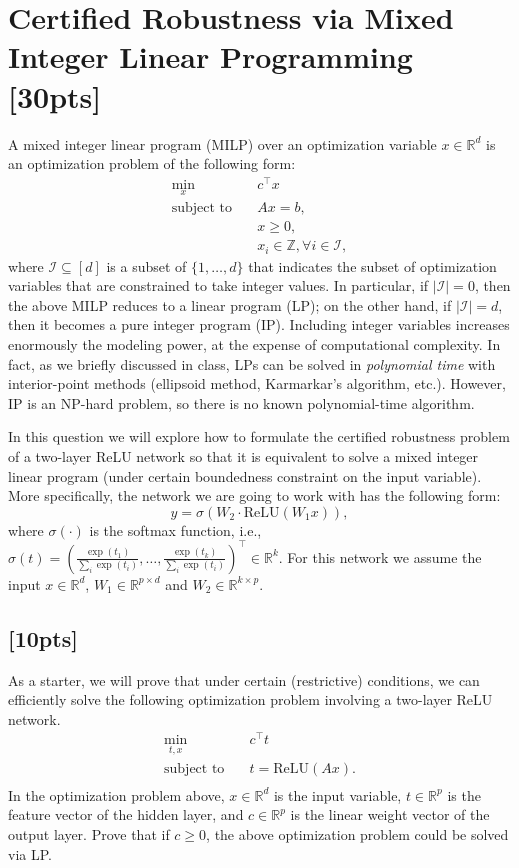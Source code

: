 \documentclass[letterpaper,11pt]{article}
\theoremstyle{definition}
\newcommand{\RR}{\mathbb{R}}
\begin{document}
\section{Certified Robustness via Mixed Integer Linear Programming [30pts]}
A mixed integer linear program (MILP) over an optimization variable $x\in\RR^d$ is an optimization problem of the following form:
\begin{align*}
    \min_x &\quad c^\top x \\
    \text{subject to} &\quad Ax = b, \\
    &\quad x \geq 0, \\
    &\quad x_i\in \mathbb{Z}, \forall i \in \mathcal{I},
\end{align*}
where $\mathcal{I}\subseteq [d]$ is a subset of $\{1, \ldots, d\}$ that indicates the subset of optimization variables that are constrained to take integer values. In particular, if $|\mathcal{I}| = 0$, then the above MILP reduces to a linear program (LP); on the other hand, if $|\mathcal{I}| = d$, then it becomes a pure integer program (IP). Including integer variables increases enormously the modeling power, at the expense of computational complexity. In fact, as we briefly discussed in class, LPs can be solved in \emph{polynomial time} with interior-point methods (ellipsoid method, Karmarkar's algorithm, etc.). However, IP is an NP-hard problem, so there is no known polynomial-time algorithm.

In this question we will explore how to formulate the certified robustness problem of a two-layer ReLU network so that it is equivalent to solve a mixed integer linear program (under certain boundedness constraint on the input variable). More specifically, the network we are going to work with has the following form:
\begin{equation*}
    \hat{y} = \sigma\left(W_2\cdot\text{ReLU}(W_1x)\right),
\end{equation*}
where $\sigma(\cdot)$ is the softmax function, i.e., $\sigma(t) = \left(\frac{\exp(t_1)}{\sum_i \exp(t_i)}, \ldots, \frac{\exp(t_k)}{\sum_i \exp(t_i)}\right)^\top\in \RR^k$. For this network we assume the input $x\in\RR^d$, $W_1\in\RR^{p\times d}$ and $W_2\in\RR^{k\times p}$. 

\subsection{[10pts]}
\label{p:2.1}
As a starter, we will prove that under certain (restrictive) conditions, we can efficiently solve the following optimization problem involving a two-layer ReLU network.
\begin{align*}
    \min_{t,x} &\quad c^\top t \\
    \text{subject to} &\quad t = \mathrm{ReLU}(Ax). \\
\end{align*}
In the optimization problem above, $x\in \RR^d$ is the input variable, $t\in \RR^p$ is the feature vector of the hidden layer, and $c\in\RR^p$ is the linear weight vector of the output layer. Prove that if $c\geq 0$, the above optimization problem could be solved via LP.
\end{document}
